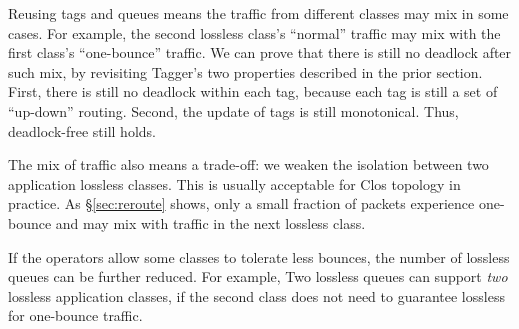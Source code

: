 Reusing tags and queues means the traffic from different classes may mix in some cases.
For example, the second lossless class's ``normal'' traffic may mix with the first 
class's ``one-bounce'' traffic.
We can prove that there is still no deadlock after such mix, by revisiting Tagger's two
properties described in the prior section. First, there is still no deadlock within each tag, 
because each tag is still a set of ``up-down'' routing. Second, the update of tags is still
monotonical. Thus, deadlock-free still holds.

 The mix of traffic also means a trade-off: we weaken the isolation between two application 
lossless classes. This is usually acceptable for Clos topology in practice. As \S\ref{sec:reroute}
shows, only a small fraction of packets experience one-bounce and may mix with traffic
in the next lossless class.

 If the operators allow some classes
to tolerate less bounces, the number of lossless queues can be further reduced. For example,
Two lossless queues can support {\em two} lossless application classes, if the second class
does not need to guarantee lossless for one-bounce traffic.
















